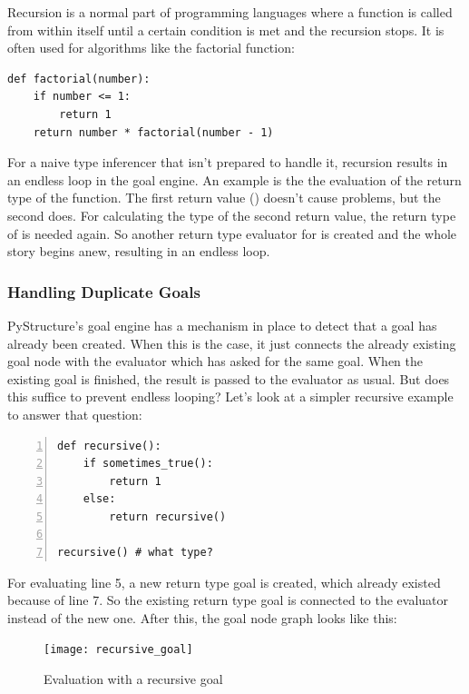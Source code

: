 \documentclass[12pt,halfparskip,DIV11,BCOR10mm]{scrreprt}
\begin{document}
Recursion is a normal part of programming languages where a function is called from within itself until a certain condition is met and the recursion stops. It is often used for algorithms like the factorial function:

\begin{lstlisting}
def factorial(number):
    if number <= 1:
        return 1
    return number * factorial(number - 1)
\end{lstlisting}

For a naive type inferencer that isn't prepared to handle it, recursion results in an endless loop in the goal engine. An example is the the evaluation of the return type of the  function. The first return value () doesn't cause problems, but the second does. For calculating the type of the second return value, the return type of  is needed again. So another return type evaluator for  is created and the whole story begins anew, resulting in an endless loop.

\subsubsection{Handling Duplicate Goals}

PyStructure's goal engine has a mechanism in place to detect that a goal has already been created. When this is the case, it just connects the already existing goal node with the evaluator which has asked for the same goal. When the existing goal is finished, the result is passed to the evaluator as usual. But does this suffice to prevent endless looping? Let's look at a simpler recursive example to answer that question:

\begin{lstlisting}[numbers=left]
def recursive():
    if sometimes_true():
        return 1
    else:
        return recursive()

recursive() # what type?
\end{lstlisting}

For evaluating line 5, a new return type goal is created, which already existed because of line 7. So the existing return type goal is connected to the evaluator instead of the new one. After this, the goal node graph looks like this:

\begin{figure}[H]
    \centering
    \texttt{[image: recursive\_goal]}
    \caption{Evaluation with a recursive goal}
    \label{fig:recursive_goal}
\end{figure}
\end{document}
